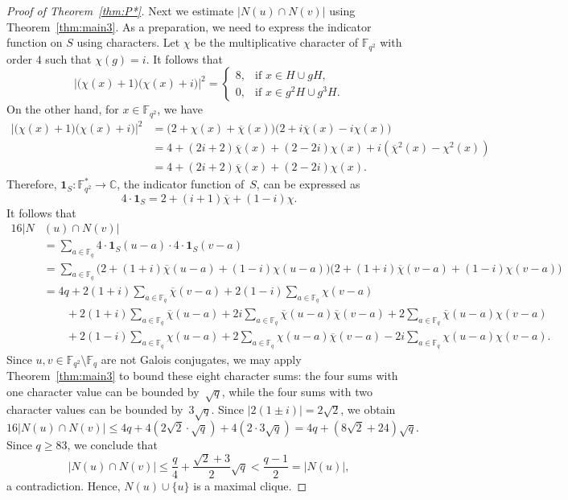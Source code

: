 \documentclass[12pt,reqno]{amsart}
\theoremstyle{definition}
\newcommand{\C}{\mathbb{C}}
\newcommand{\F}{\mathbb{F}}
\begin{document}
\begin{proof}[Proof of Theorem~\ref{thm:P*}]
Next we estimate $|N(u) \cap N(v)|$ using Theorem~\ref{thm:main3}. As a preparation, we need to express the indicator function on $S$ using characters. Let $\chi$ be the multiplicative character of $\F_{q^2}$ with order $4$ such that $\chi(g)=i$. It follows that
$$\big|\big(\chi(x)+1\big)\big(\chi(x)+i\big)\big|^2
=
\begin{cases}
8, & \text{if } x \in H \cup gH,\\
0,  & \text{if } x \in g^2H \cup g^3H.
\end{cases}
$$
On the other hand, for $x \in \F_{q^2}$, we have
\begin{align*}
\big|\big(\chi(x)+1\big)\big(\chi(x)+i\big)\big|^2
&=\big(2+\chi(x)+\overline{\chi}(x)\big)\big(2+i\overline{\chi}(x)-i\chi(x)\big)\\
&=4+(2i+2)\overline{\chi}(x)+(2-2i)\chi(x)+i(\overline{\chi}^2(x)-\chi^2(x))\\
&=4+(2i+2)\overline{\chi}(x)+(2-2i)\chi(x).
\end{align*}
Therefore, $\mathbf{1}_S\colon \F_{q^2}^* \to \C$, the indicator function of~$S$, can be expressed as
$$
4\cdot\mathbf{1}_S=2+(i+1)\overline{\chi}+(1-i)\chi.
$$
It follows that
\begin{align*}
16|N&(u) \cap N(v)|\\
&=\sum_{a \in \F_q} 4\cdot\mathbf{1}_S(u-a) \cdot 4\cdot\mathbf{1}_S(v-a)\\
&=\sum_{a \in \F_q} \big(2+(1+i)\overline{\chi}(u-a)+(1-i)\chi(u-a)\big) \big(2+(1+i)\overline{\chi}(v-a)+(1-i)\chi(v-a)\big)\\
&=4q + 2(1+i)\sum_{a \in \F_q} \overline\chi(v-a) + 2(1-i) \sum_{a \in \F_q} \chi(v-a) \\
&\qquad{}+ 2(1+i) \sum_{a \in \F_q} \overline\chi(u-a) + 2i \sum_{a \in \F_q} \overline\chi(u-a)\overline\chi(v-a) + 2 \sum_{a \in \F_q} \overline\chi(u-a) \chi(v-a) \\
&\qquad{}+ 2(1-i) \sum_{a \in \F_q} \chi(u-a) + 2 \sum_{a \in \F_q} \chi(u-a)\overline\chi(v-a) - 2i \sum_{a \in \F_q} \chi(u-a)\chi(v-a).
\end{align*}
Since $u,v\in \F_{q^2} \setminus \F_q$ are not Galois conjugates, we may apply Theorem~\ref{thm:main3} to bound these eight character sums: the four sums with one character value can be bounded by~$\sqrt{q}$, while the four sums with two character values can be bounded by~$3\sqrt{q}$. Since $|2(1\pm i)|=2\sqrt2$, we obtain
$$
16 |N(u) \cap N(v)|\leq 4q + 4(2\sqrt2\cdot\sqrt q) + 4(2\cdot 3\sqrt q) = 4q + (8\sqrt2+24)\sqrt q.
$$
Since $q \geq 83$, we conclude that
$$
|N(u) \cap N(v)|\leq \frac{q}{4}+\frac{\sqrt{2}+3}{2}\sqrt{q}< \frac{q-1}{2}=|N(u)|,
$$
a contradiction. Hence, $N(u)\cup \{u\}$ is a maximal clique.
\end{proof}
\end{document}
